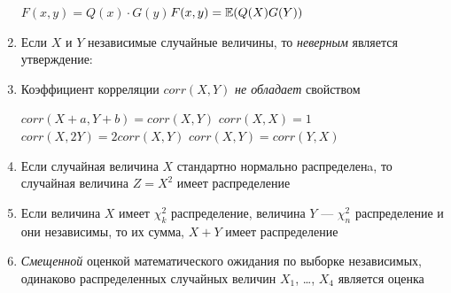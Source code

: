 \documentclass[12pt, a4paper]{article}\usepackage[]{graphicx}\usepackage[]{color}
\begin{document}
\begin{enumerate}
{$F(x,y)=Q(x)\cdot G(y)$}{$F(x,y)=\mathbb{E}(Q(X)G(Y))$}

\item Если $X$ и $Y$ независимые случайные величины, то \emph{неверным} является утверждение:




\item Коэффициент корреляции $corr(X,Y)$ \emph{не обладает} свойством

{$corr(X+a,Y+b)=corr(X,Y)$}
{$corr(X,X)=1$}
{$corr(X,2Y)=2corr(X,Y)$}
{$corr(X,Y)= corr(Y,X)$}



\item Если случайная величина $X$ стандартно нормально распределенa, то случайная величина $Z=X^2$ имеет распределение


\item Если величина $X$ имеет $\chi^2_k$ распределение, величина $Y$ — $\chi^2_n$ распределение и они независимы, то их сумма, $X+Y$ имеет распределение


\item \emph{Смещенной} оценкой математического ожидания по выборке независимых, одинаково распределенных случайных величин $X_1$, \ldots, $X_4$ является оценка


\end{enumerate}
\end{document}
